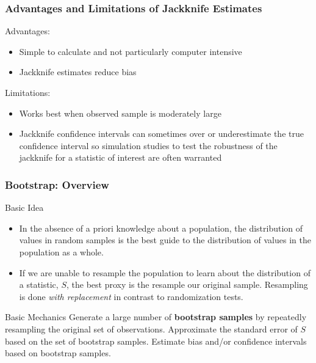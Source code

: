 \documentclass{beamer}
\begin{document}
\begin{frame}
  \frametitle{Advantages and Limitations of Jackknife Estimates}

Advantages:
\begin{itemize}
    \item Simple to calculate and not particularly computer intensive
    \item Jackknife estimates reduce bias
\end{itemize}

Limitations:
\begin{itemize}
    \item Works best when observed sample is moderately large
    \item Jackknife confidence intervals can sometimes over or underestimate the true confidence interval so simulation studies to test the robustness of the jackknife for a statistic of interest are often warranted
\end{itemize}

\end{frame}

\begin{frame}
  \frametitle{Bootstrap: Overview}

\begin{block}{Basic Idea}
\begin{itemize}
    \item In the absence of a priori knowledge about a population, the distribution of values in random samples is the best guide to the distribution of values in the population as a whole.

    \item If we are unable to resample the population to learn about the distribution of a statistic, $S$, the best proxy is the resample our original sample. Resampling is done \emph{with replacement} in contrast to randomization tests.
\end{itemize}
\end{block}


\begin{block}{Basic Mechanics}
Generate a large number of \textbf{bootstrap samples} by repeatedly resampling the original set of observations.  Approximate the standard error of $S$ based on the set of bootstrap samples. Estimate bias and/or confidence intervals based on bootstrap samples.

\end{block}



\end{frame}
\end{document}
